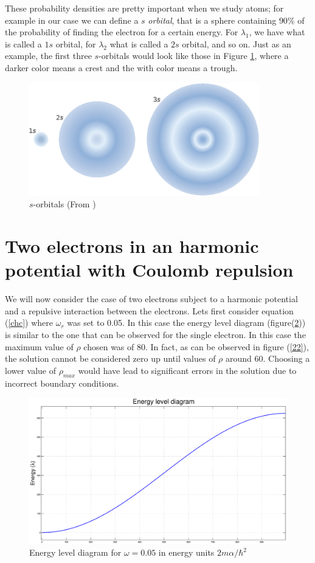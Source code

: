 \documentclass {article}
\begin{document}
These probability densities are pretty important when we study atoms; for example in our case we can define a $s$ \emph{orbital}, that is a sphere containing $90\%$ of the probability of finding the electron for a certain energy. For $\lambda_1$, we have what is called a $1s$ orbital, for $\lambda_2$ what is called a $2s$ orbital, and so on. Just as an example, the first three $s$-orbitals would look like those in Figure \ref{fig:s_orbitals}, where a darker color means a crest and the with color means a trough.

\begin{figure}[H]
	\centering
	\includegraphics[width=10cm]{orbitals}
	\caption{$s$-orbitals (From \cite{oxtoby})}
	\label{fig:s_orbitals}
\end{figure}


\section{Two electrons in an harmonic potential with Coulomb repulsion}

We will now consider the case of two electrons subject to a harmonic potential and a repulsive interaction between the electrons. Lets first consider equation (\ref{chc}) where $\omega_r$ was set to 0.05. In this case the energy level diagram (figure(\ref{21})) is similar to the one that can be observed for the single electron. In this case the maximum value of $\rho$ chosen was of 80. In fact, as can be observed in figure (\ref{22}), the solution cannot be considered zero up until values of $\rho$ around 60. Choosing a lower value of $\rho_{max}$ would have lead to significant errors in the solution due to incorrect boundary conditions. 

\begin{figure}[H]
	\centering
	\includegraphics[width=16cm]{2elen}
	\caption{Energy level diagram for $\omega=0.05$ in energy units $2m\alpha / \hbar^2$}
	\label{21}
\end{figure}
\end{document}
